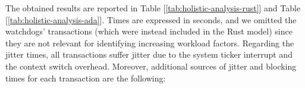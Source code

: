 \begin{table}[H]
  \label{tab:holistic-analysis-ada}
  \caption{Whetstone Operations}
\end{table}

The obtained results are reported in Table [\ref{tab:holistic-analysis-rust}] and
Table [\ref{tab:holistic-analysis-ada}]. Times are expressed in seconds, and we
omitted the watchdogs' transactions (which were instead included in the Rust
model) since they are not relevant for identifying increasing workload factors.
Regarding the jitter times, all transactions suffer jitter due to the system
ticker interrupt and the context switch overhead. Moreover, additional sources 
of jitter and blocking times for each transaction are the following:

